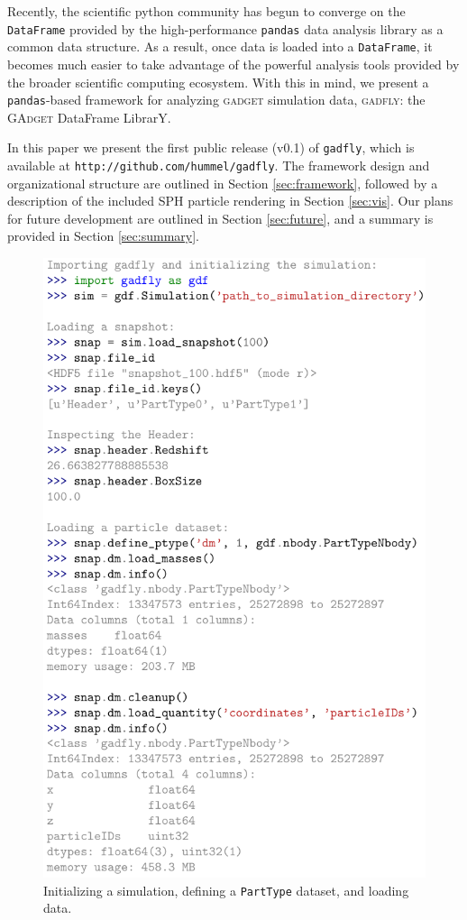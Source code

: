 \documentclass{thesis}
\newcommand{\code}[1]{\texttt{#1}}
\begin{document}
Recently, the scientific python community has begun to converge on the \code{DataFrame} provided by the high-performance \code{pandas} data analysis library as a common data structure. 
As a result, once data is loaded into a \code{DataFrame}, it becomes much easier to take advantage of the powerful analysis tools provided by the broader scientific computing ecosystem.
With this in mind, we present a \code{pandas}-based framework for analyzing \textsc{gadget} simulation data, \textsc{gadfly}: the \textsc{GAdget} DataFrame LibrarY.

In this paper we present the first public release (v0.1) of \code{gadfly}, which is available at \code{http://github.com/hummel/gadfly}. 
The framework design and organizational structure are outlined in Section \ref{sec:framework}, followed by a description of the included SPH particle rendering  in Section \ref{sec:vis}.  Our plans for future development are outlined in Section \ref{sec:future}, and a summary is provided in Section \ref{sec:summary}.

\begin{figure}
\begin{center}
\includegraphics[width=.8\columnwidth]{figures/code_usage/code_usage}
\caption{\label{fig:usage_example}
Initializing a simulation, defining a \code{PartType} dataset, and loading data.%
}
\end{center}
\end{figure}
\end{document}
